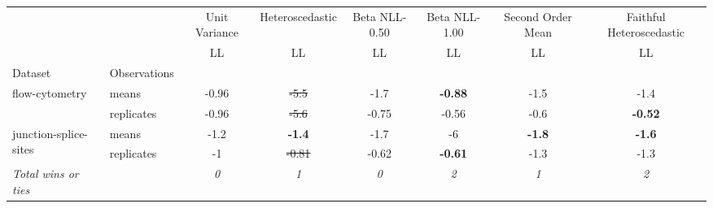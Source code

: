 \begin{tabular}{ll|c|c|c|c|c|c}
\toprule
{} & {} & {Unit Variance} & {Heteroscedastic} & {Beta NLL-0.50} & {Beta NLL-1.00} & {Second Order Mean} & {Faithful Heteroscedastic} \\
{} & {} & {LL} & {LL} & {LL} & {LL} & {LL} & {LL} \\
{Dataset} & {Observations} & {} & {} & {} & {} & {} & {} \\
\midrule
\multirow[t]{2}{*}{flow-cytometry} & means & -0.96 & \sout{-5.5} & -1.7 & \textbf{-0.88} & -1.5 & -1.4 \\
 & replicates & -0.96 & \sout{-5.6} & -0.75 & -0.56 & -0.6 & \textbf{-0.52} \\
\multirow[t]{2}{*}{junction-splice-sites} & means & -1.2 & \textbf{-1.4} & -1.7 & -6 & \textbf{-1.8} & \textbf{-1.6} \\
 & replicates & -1 & \sout{-0.81} & -0.62 & \textbf{-0.61} & -1.3 & -1.3 \\
\textit{{Total wins or ties}} &  & \textit{0} & \textit{1} & \textit{0} & \textit{2} & \textit{1} & \textit{2} \\
\bottomrule
\end{tabular}
